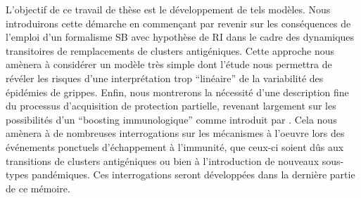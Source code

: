 L'objectif de ce travail de thèse est le développement de tels
modèles. Nous introduirons cette démarche en commençant par revenir
sur les conséquences de l'emploi d'un formalisme SB avec hypothèse de
RI dans le cadre des dynamiques transitoires de remplacements de
clusters antigéniques. Cette approche nous amènera à considérer un
modèle très simple dont l'étude nous permettra de révéler les risques
d'une interprétation trop ``linéaire'' de la variabilité des épidémies
de grippes. Enfin, nous montrerons la nécessité d'une description fine
du processus d'acquisition de protection partielle, revenant largement
sur les possibilités d'un ``boosting immunologique'' comme introduit
par \citet{Ferguson2003}. Cela nous amènera à de nombreuses
interrogations sur les mécanismes à l'oeuvre lors des événements
ponctuels d'échappement à l'immunité, que ceux-ci soient dûs aux
transitions de clusters antigéniques ou bien à l'introduction de
nouveaux sous-types pandémiques. Ces interrogations seront développées
dans la dernière partie de ce mémoire.






